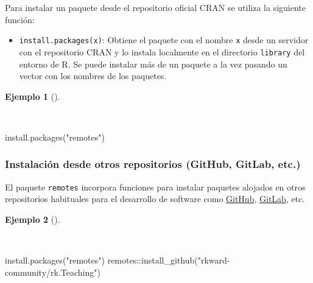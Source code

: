 \documentclass[
  a4paper,
]{scrreport}
\newenvironment{Shaded}{\begin{snugshade}}{\end{snugshade}}
\newcommand{\FunctionTok}[1]{\textcolor[rgb]{0.28,0.35,0.67}{#1}}
\newcommand{\NormalTok}[1]{\textcolor[rgb]{0.00,0.23,0.31}{#1}}
\newcommand{\SpecialCharTok}[1]{\textcolor[rgb]{0.37,0.37,0.37}{#1}}
\newcommand{\StringTok}[1]{\textcolor[rgb]{0.13,0.47,0.30}{#1}}
\providecommand{\tightlist}{%
  \setlength{\itemsep}{0pt}\setlength{\parskip}{0pt}}\usepackage{longtable,booktabs,array}
\theoremstyle{definition}
\theoremstyle{definition}
\newtheorem{example}{Ejemplo}[chapter]
\theoremstyle{remark}
\begin{document}
Para instalar un paquete desde el repositorio oficial CRAN se utiliza la
siguiente función:

\begin{itemize}
\tightlist
\item
  \texttt{install.packages(x)}: Obtiene el paquete con el nombre
  \texttt{x} desde un servidor con el repositorio CRAN y lo instala
  localmente en el directorio \texttt{library} del entorno de R. Se
  puede instalar más de un paquete a la vez pasando un vector con los
  nombres de los paquetes.
\end{itemize}

\begin{example}[]\protect\hypertarget{exm-instalacion-paquetes}{}\label{exm-instalacion-paquetes}

~

\begin{Shaded}
\begin{Highlighting}[]
\FunctionTok{install.packages}\NormalTok{(}\StringTok{"remotes"}\NormalTok{)}
\end{Highlighting}
\end{Shaded}

\end{example}

\subsubsection{Instalación desde otros repositorios (GitHub, GitLab,
etc.)}\label{instalaciuxf3n-desde-otros-repositorios-github-gitlab-etc.}

El paquete \texttt{remotes} incorpora funciones para instalar paquetes
alojados en otros repositorios habituales para el desarrollo de software
como \href{https://github.com/}{GitHub},
\href{httpsb://gitlab.com/}{GitLab}, etc.

\begin{example}[]\protect\hypertarget{exm-instalacion-paquetes-github}{}\label{exm-instalacion-paquetes-github}

~

\begin{Shaded}
\begin{Highlighting}[]
\FunctionTok{install.packages}\NormalTok{(}\StringTok{"remotes"}\NormalTok{)}
\NormalTok{remotes}\SpecialCharTok{::}\FunctionTok{install\_github}\NormalTok{(}\StringTok{"rkward{-}community/rk.Teaching"}\NormalTok{)}
\end{Highlighting}
\end{Shaded}

\end{example}
\end{document}
